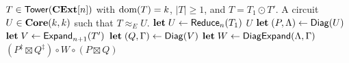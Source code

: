 \begin{algorithm}[t]
\caption{$\Expand_{n+1}( T )$}\label{Alg:Expand}
\begin{algorithmic}
\Require $T \in \mathsf{Tower}( \mathbf{CExt}[n] )$ with $\operatorname{dom}( T ) = k$, $|T| \ge 1$, and $T = T_1 \odot T'$.
\Ensure A circuit $U \in \mathbf{Core}( k, k )$ such that $T \approx_E U$.
    \State $\textbf{let} \; U \gets \mathsf{Reduce}_n( T_1 )$
        \Return $U$
    \EndIf
    \State $\textbf{let} \; ( P, \Lambda ) \gets \mathsf{Diag}( U )$
    \State $\textbf{let} \; V \gets \mathsf{Expand}_{n+1}( T' )$
    \State $\textbf{let} \; ( Q, \Gamma ) \gets \mathsf{Diag}( V )$
    \State $\textbf{let} \; W \gets \mathsf{DiagExpand}( \Lambda, \Gamma )$
    \State \Return $( P^\ddagger \boxtimes Q^\ddagger ) \circ W \circ ( P \boxtimes Q )$
\end{algorithmic}
\end{algorithm}
